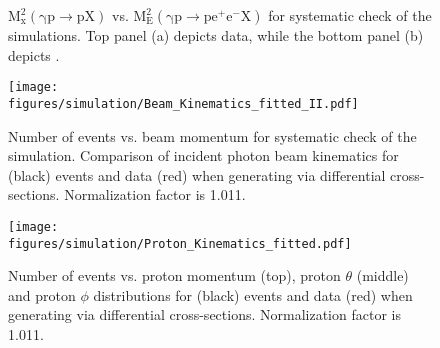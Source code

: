 	\begin{figure}[h!]\begin{center}
			
			\caption[$\mathrm{M_x^2(\gamma p \to p X)}$ vs. $\mathrm{M_E^2(\gamma p \to pe^+e^- X)}$ for simulation systematic check]{\label{fig:simsmear.mEMxP.data.MC}$\mathrm{M_x^2(\gamma p \to p X)}$ vs. $\mathrm{M_E^2(\gamma p \to pe^+e^- X)}$ for systematic check of the simulations. Top panel (a) depicts data, while the bottom panel (b) depicts .}
			
		\end{center}\end{figure}
		\begin{figure}[h!]\begin{center}
				\texttt{[image: \\figures/simulation/Beam\_Kinematics\_fitted\_II.pdf]}
				\caption[Number of events vs. beam momentum for simulation systematic check]{\label{fig:simsmear.beam}Number of events vs. beam momentum for systematic check of the simulation. Comparison of incident photon beam kinematics for  (black) events and data (red) when generating  via differential cross-sections. Normalization factor is 1.011.}
			\end{center}\end{figure} 
			\begin{figure}[h!]\begin{center}
					\texttt{[image: \\figures/simulation/Proton\_Kinematics\_fitted.pdf]}
					\caption[Number of events vs. proton momentum (top), proton $\theta$ (middle) and proton $\phi$ distributions for  (black) events and data (red) when generating  via differential cross-sections]{\label{fig:simsmear.prot}Number of events vs. proton momentum (top), proton $\theta$ (middle) and proton $\phi$ distributions for  (black) events and data (red) when generating  via differential cross-sections. Normalization factor is 1.011. }
				\end{center}\end{figure} 
